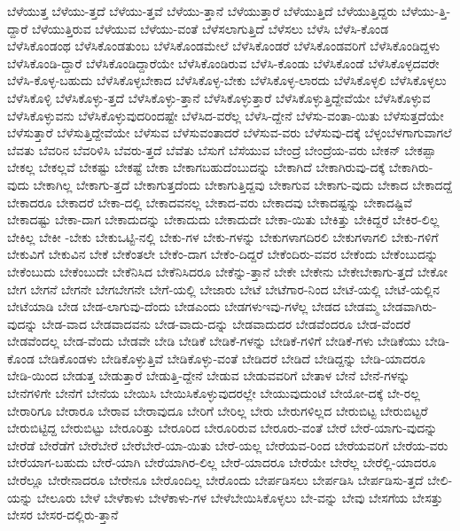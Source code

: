 {ಬೆಳೆಯುತ್ತ
ಬೆಳೆಯು-ತ್ತದೆ
ಬೆಳೆಯು-ತ್ತವೆ
ಬೆಳೆಯು-ತ್ತಾನೆ
ಬೆಳೆಯುತ್ತಾರೆ
ಬೆಳೆಯುತ್ತಿದೆ
ಬೆಳೆಯುತ್ತಿದ್ದರು
ಬೆಳೆಯು-ತ್ತಿ-ದ್ದಾರೆ
ಬೆಳೆಯುತ್ತಿರುವ
ಬೆಳೆಯುವ
ಬೆಳೆಯು-ವಂತೆ
ಬೆಳೆಸಲಾಗುತ್ತಿದೆ
ಬೆಳೆಸಲು
ಬೆಳೆಸಿ
ಬೆಳೆಸಿ-ಕೊಂಡ
ಬೆಳೆಸಿಕೊಂಡಂಥ
ಬೆಳೆಸಿಕೊಂಡತುಂಬ
ಬೆಳೆಸಿಕೊಂಡಮೇಲೆ
ಬೆಳೆಸಿಕೊಂಡರೆ
ಬೆಳೆಸಿಕೊಂಡವರಿಗೆ
ಬೆಳೆಸಿಕೊಂಡಿದ್ದಳು
ಬೆಳೆಸಿಕೊಂಡಿ-ದ್ದಾರೆ
ಬೆಳೆಸಿಕೊಂಡಿದ್ದಾರೆಯೇ
ಬೆಳೆಸಿಕೊಂಡಿರುವ
ಬೆಳೆಸಿ-ಕೊಂಡು
ಬೆಳೆಸಿಕೊಂಡೆ
ಬೆಳೆಸಿಕೊಳ್ಳದವರೇ
ಬೆಳೆಸಿ-ಕೊಳ್ಳ-ಬಹುದು
ಬೆಳೆಸಿಕೊಳ್ಳಬೇಕಾದ
ಬೆಳೆಸಿಕೊಳ್ಳ-ಬೇಕು
ಬೆಳೆಸಿಕೊಳ್ಳ-ಲಾರದು
ಬೆಳೆಸಿಕೊಳ್ಳಲಿ
ಬೆಳೆಸಿಕೊಳ್ಳಲು
ಬೆಳೆಸಿಕೊಳ್ಳಿ
ಬೆಳೆಸಿಕೊಳ್ಳು-ತ್ತದೆ
ಬೆಳೆಸಿಕೊಳ್ಳು-ತ್ತಾನೆ
ಬೆಳೆಸಿಕೊಳ್ಳುತ್ತಾರೆ
ಬೆಳೆಸಿಕೊಳ್ಳುತ್ತಿದ್ದೇವೆಯೇ
ಬೆಳೆಸಿಕೊಳ್ಳುವ
ಬೆಳೆಸಿಕೊಳ್ಳುವನು
ಬೆಳೆಸಿಕೊಳ್ಳುವುದರಿಂದಷ್ಟೇ
ಬೆಳೆಸಿದ-ವರೆಲ್ಲ
ಬೆಳೆಸಿ-ದ್ದೇನೆ
ಬೆಳೆಸು-ವಂತಾ-ಯಿತು
ಬೆಳೆಸುತ್ತದೆಯೇ
ಬೆಳೆಸುತ್ತಾರೆ
ಬೆಳೆಸುತ್ತಿದ್ದೇವೆಯೇ
ಬೆಳೆಸುವ
ಬೆಳೆಸುವಂತಾದರೆ
ಬೆಳೆಸುವ-ವರು
ಬೆಳೆಸುವು-ದಕ್ಕೆ
ಬೆಳ್ಳಂಬೆಳಗಾಗುವಾಗಲೆ
ಬೆವತು
ಬೆವರಿನ
ಬೆವರಿಳಿಸಿ
ಬೆವರು-ತ್ತದೆ
ಬೆವೆತು
ಬೆಸುಗೆ
ಬೆಸೆಯುವ
ಬೇಂದ್ರೆ
ಬೇಂದ್ರೆಯ-ವರು
ಬೇಕನ್
ಬೇಕಪ್ಪಾ
ಬೇಕಲ್ಲ
ಬೇಕಲ್ಲವೆ
ಬೇಕಷ್ಟು
ಬೇಕಷ್ಟೆ
ಬೇಕಾ
ಬೇಕಾಗಬಹುದೆಂಬುದನ್ನು
ಬೇಕಾಗಿದೆ
ಬೇಕಾಗಿರುವು-ದಕ್ಕೆ
ಬೇಕಾಗಿರು-ವುದು
ಬೇಕಾಗಿಲ್ಲ
ಬೇಕಾಗು-ತ್ತದೆ
ಬೇಕಾಗುತ್ತದೆಂದು
ಬೇಕಾಗುತ್ತಿದ್ದವು
ಬೇಕಾಗುವ
ಬೇಕಾಗು-ವುದು
ಬೇಕಾದ
ಬೇಕಾದದ್ದೆ
ಬೇಕಾದರೂ
ಬೇಕಾದರೆ
ಬೇಕಾ-ದಲ್ಲಿ
ಬೇಕಾದವನಲ್ಲ
ಬೇಕಾದ-ವರು
ಬೇಕಾದವು
ಬೇಕಾದಷ್ಟನ್ನು
ಬೇಕಾದಷ್ಟಿವೆ
ಬೇಕಾದಷ್ಟು
ಬೇಕಾ-ದಾಗ
ಬೇಕಾದುದನ್ನು
ಬೇಕಾದುದು
ಬೇಕಾದುದೇ
ಬೇಕಾ-ಯಿತು
ಬೇಕಿತ್ತು
ಬೇಕಿದ್ದರೆ
ಬೇಕಿರ-ಲಿಲ್ಲ
ಬೇಕಿಲ್ಲ
ಬೇಕೀ
-ಬೇಕು
ಬೇಕುಒಟ್ಟಿ-ನಲ್ಲಿ
ಬೇಕು-ಗಳ
ಬೇಕು-ಗಳನ್ನು
ಬೇಕುಗಳಾಗದಿರಲಿ
ಬೇಕುಗಳಾಗಲಿ
ಬೇಕು-ಗಳಿಗೆ
ಬೇಕುವಿಗೆ
ಬೇಕುವಿನ
ಬೇಕೆ
ಬೇಕೆಂತಲೇ
ಬೇಕೆಂ-ದಾಗ
ಬೇಕೆಂ-ದಿದ್ದರೆ
ಬೇಕೆಂದಿರು-ವವರ
ಬೇಕೆಂದು
ಬೇಕೆಂಬುದನ್ನು
ಬೇಕೆಂಬುದು
ಬೇಕೆಂಬುದೇ
ಬೇಕೆನಿಸಿದ
ಬೇಕೆನಿಸಿದರೂ
ಬೇಕೆನ್ನು-ತ್ತಾನೆ
ಬೇಕೇ
ಬೇಕೇನು
ಬೇಕೇಬೇಕಾಗು-ತ್ತದೆ
ಬೇಕೋ
ಬೇಗ
ಬೇಗನೆ
ಬೇಗನೇ
ಬೇಗಬೇಗನೇ
ಬೇಗೆ-ಯಲ್ಲಿ
ಬೇಜಾರು
ಬೇಟೆ
ಬೇಟೆಗಾರ-ನಿಂದ
ಬೇಟೆ-ಯಲ್ಲಿ
ಬೇಟೆ-ಯಲ್ಲಿನ
ಬೇಟೆಯಾಡಿ
ಬೇಡ
ಬೇಡ-ಲಾಗುವು-ದೆಂದು
ಬೇಡಎಂದು
ಬೇಡಗಳುಇವು-ಗಳೆಲ್ಲ
ಬೇಡದ
ಬೇಡಮ್ಮ
ಬೇಡವಾಗಿರು-ವುದನ್ನು
ಬೇಡ-ವಾದ
ಬೇಡವಾದವನು
ಬೇಡ-ವಾದು-ದನ್ನು
ಬೇಡವಾದುದರ
ಬೇಡವೆಂದರೂ
ಬೇಡ-ವೆಂದರೆ
ಬೇಡವೆಂದಲ್ಲ
ಬೇಡ-ವೆಂದು
ಬೇಡವೇ
ಬೇಡಿ
ಬೇಡಿಕೆ
ಬೇಡಿಕೆ-ಗಳನ್ನು
ಬೇಡಿಕೆ-ಗಳಿಗೆ
ಬೇಡಿಕೆ-ಗಳು
ಬೇಡಿಕೆಯು
ಬೇಡಿ-ಕೊಂಡ
ಬೇಡಿಕೊಂಡಳು
ಬೇಡಿಕೊಳ್ಳುತ್ತಿವೆ
ಬೇಡಿಕೊಳ್ಳು-ವಂತೆ
ಬೇಡಿದರೆ
ಬೇಡಿದೆ
ಬೇಡಿದ್ದನ್ನು
ಬೇಡಿ-ಯಾದರೂ
ಬೇಡಿ-ಯಿಂದ
ಬೇಡುತ್ತ
ಬೇಡುತ್ತಾರೆ
ಬೇಡುತ್ತಿ-ದ್ದೇನೆ
ಬೇಡುವ
ಬೇಡುವವರಿಗೆ
ಬೇತಾಳ
ಬೇನೆ
ಬೇನೆ-ಗಳನ್ನು
ಬೇನೆಗಳಿಗೇ
ಬೇನೆಗೆ
ಬೇನೆಯ
ಬೇಯಿಸಿ
ಬೇಯಿಸಿಕೊಳ್ಳುವುದರಲ್ಲೇ
ಬೇಯುವುದುಂಟೆ
ಬೇಯೋ-ದಕ್ಕೆ
ಬೇ-ರಲ್ಲ
ಬೇರಾರಿಗೂ
ಬೇರಾರೂ
ಬೇರಾವ
ಬೇರಾವುದೂ
ಬೇರಿಗೆ
ಬೇರಿಲ್ಲ
ಬೇರು
ಬೇರುಗಳಿಲ್ಲದ
ಬೇರುಬಿಟ್ಟ
ಬೇರುಬಿಟ್ಟರೆ
ಬೇರುಬಿಟ್ಟಿದ್ದ
ಬೇರುಬಿಟ್ಟು
ಬೇರೂರಿತ್ತು
ಬೇರೂರಿದ
ಬೇರೂರಿರುವ
ಬೇರೂರು-ವಂತೆ
ಬೇರೆ
ಬೇರೆ-ಯಾಗು-ವುದನ್ನು
ಬೇರೆಡೆ
ಬೇರೆಡೆಗೆ
ಬೇರೆಬೇರೆ
ಬೇರೆಬೇರೆ-ಯಾ-ಯಿತು
ಬೇರೆ-ಯಲ್ಲ
ಬೇರೆಯವ-ರಿಂದ
ಬೇರೆಯವರಿಗೆ
ಬೇರೆಯ-ವರು
ಬೇರೆಯಾಗ-ಬಹುದು
ಬೇರೆ-ಯಾಗಿ
ಬೇರೆಯಾಗಿರ-ಲಿಲ್ಲ
ಬೇರೆ-ಯಾದರೂ
ಬೇರೆಯೇ
ಬೇರೆಲ್ಲ
ಬೇರೆಲ್ಲಿ-ಯಾದರೂ
ಬೇರೆಲ್ಲೂ
ಬೇರೇನಾದರೂ
ಬೇರೇನೂ
ಬೇರೊಂದಿಲ್ಲ
ಬೇರೊಂದು
ಬೇರ್ಪಡಿಸಲು
ಬೇರ್ಪಡಿಸಿ
ಬೇರ್ಪಡಿಸು-ತ್ತದೆ
ಬೇಲಿ-ಯನ್ನು
ಬೇಲೂರು
ಬೇಳೆ
ಬೇಳೆಕಾಳು
ಬೇಳೆಕಾಳು-ಗಳ
ಬೇಳೆಬೇಯಿಸಿಕೊಳ್ಳಲು
ಬೇ-ವನ್ನು
ಬೇವು
ಬೇಸಗೆಯ
ಬೇಸತ್ತು
ಬೇಸರ
ಬೇಸರ-ದಲ್ಲಿರು-ತ್ತಾನೆ
}

